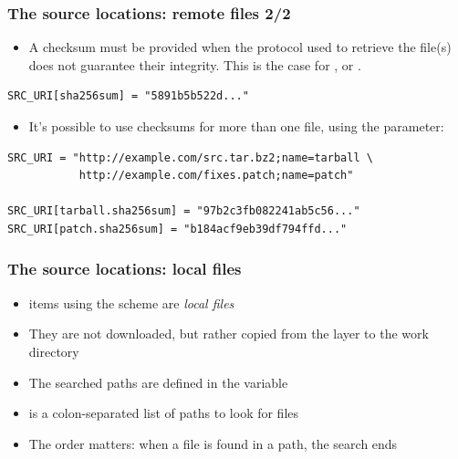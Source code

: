 \begin{frame}[fragile]
  \frametitle{The source locations: remote files 2/2}
  \begin{itemize}
    \item A checksum must be provided when the protocol
      used to retrieve the file(s) does not guarantee their integrity.
      This is the case for ,  or .
  \end{itemize}
  \begin{block}{}
    \begin{verbatim}
SRC_URI[sha256sum] = "5891b5b522d..."
    \end{verbatim}
  \end{block}
  \begin{itemize}
    \item It's possible to use checksums for more than one file, using
      the  parameter:
  \end{itemize}
  \begin{block}{}
    \begin{verbatim}
SRC_URI = "http://example.com/src.tar.bz2;name=tarball \
           http://example.com/fixes.patch;name=patch"

SRC_URI[tarball.sha256sum] = "97b2c3fb082241ab5c56..."
SRC_URI[patch.sha256sum] = "b184acf9eb39df794ffd..."
    \end{verbatim}
  \end{block}
\end{frame}

\begin{frame}
  \frametitle{The source locations: local files}
  \begin{itemize}
    \item {} items using the  scheme are {\em
      local files}
    \item They are not downloaded, but rather copied from the layer to the
      work directory
    \item The searched paths are defined in the 
      variable
    \item {} is a colon-separated list of paths to look for
      files
    \item The order matters: when a file is found in a path, the search
      ends
  \end{itemize}
\end{frame}

